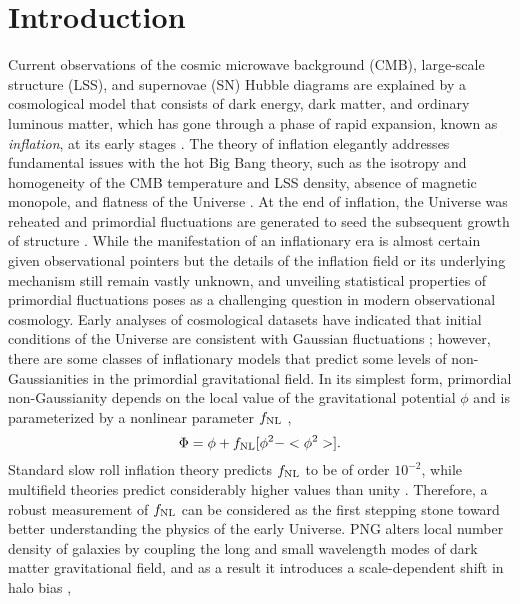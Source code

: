 \section{Introduction}
\label{sec:introduction}
Current observations of the cosmic microwave background (CMB), large-scale structure (LSS), and supernovae (SN) Hubble diagrams are explained by a cosmological model that consists of dark energy, dark matter, and ordinary luminous matter, which has gone through a phase of rapid expansion, known as \textit{inflation},  at its early stages \citep[see, e.g.,][]{weinberg2013observational}. The theory of inflation elegantly addresses fundamental issues with the hot Big Bang theory, such as the isotropy and homogeneity of the CMB temperature and LSS density, absence of magnetic monopole, and flatness of the Universe \citep[see, e.g.,][]{weinberg2008cosmology}. At the end of inflation, the Universe was reheated and primordial fluctuations are generated to seed the subsequent growth of structure \citep{kofman1994reheating, bassett2006inflation, lyth2009primordial}. While the manifestation of an inflationary era is almost certain given observational pointers but the details of the inflation field or its underlying mechanism still remain vastly unknown, and unveiling statistical properties of primordial fluctuations poses as a challenging question in modern observational cosmology. Early analyses of cosmological datasets have indicated that initial conditions of the Universe are consistent with Gaussian fluctuations \citep{guth2005inflationary}; however, there are some classes of inflationary models that predict some levels of non-Gaussianities in the primordial gravitational field. In its simplest form, primordial non-Gaussianity depends on the local value of the gravitational potential $\phi$ and is parameterized by a nonlinear parameter $f_{\rm NL}$ \citep{komatsu2001acoustic},
\begin{equation}
    \Phi = \phi + f_{\rm NL} [\phi^{2} -  <\phi^{2}>].
\end{equation}
Standard slow roll inflation theory predicts $f_{\rm NL}$ to be of order $10^{-2}$, while multifield theories predict considerably higher values than unity \citep[see, e.g.,][]{de2017next}. Therefore, a robust measurement of $f_{\rm NL}$ can be considered as the first stepping stone toward better understanding the physics of the early Universe.  PNG alters local number density of galaxies by coupling the long and small wavelength modes of dark matter gravitational field, and as a result it introduces a scale-dependent shift in halo bias \citep[see, e.g.,][]{dalal2008imprints, slosar2008constraints},
